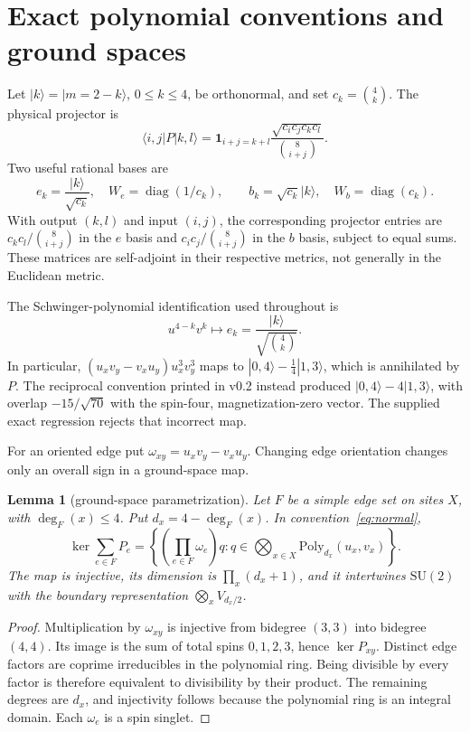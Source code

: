 \documentclass[11pt,a4paper]{article}
\newtheorem{lemma}[theorem]{Lemma}\newtheorem{proposition}[theorem]{Proposition}
\theoremstyle{remark}\newtheorem{remark}[theorem]{Remark}
\begin{document}
\section{Exact polynomial conventions and ground spaces}\label{sec:polynomial}
Let $|k\rangle=|m=2-k\rangle$, $0\le k\le4$, be orthonormal, and set $c_k=\binom4k$. The physical projector is
\begin{equation}\label{eq:P}
 \langle i,j|P|k,l\rangle=
 \mathbf1_{i+j=k+l}\frac{\sqrt{c_ic_jc_kc_l}}{\binom8{i+j}}.
\end{equation}
Two useful rational bases are
\[
 e_k=\frac{|k\rangle}{\sqrt{c_k}},\quad W_e=\operatorname{diag}(1/c_k),
 \qquad b_k=\sqrt{c_k}|k\rangle,\quad W_b=\operatorname{diag}(c_k).
\]
With output $(k,l)$ and input $(i,j)$, the corresponding projector entries are $c_kc_l/\binom8{i+j}$ in the $e$ basis and $c_ic_j/\binom8{i+j}$ in the $b$ basis, subject to equal sums. These matrices are self-adjoint in their respective metrics, not generally in the Euclidean metric.

The Schwinger-polynomial identification used throughout is
\begin{equation}\label{eq:normal}
 u^{4-k}v^k\longmapsto e_k=\frac{|k\rangle}{\sqrt{\binom4k}}.
\end{equation}
In particular, $(u_xv_y-v_xu_y)u_x^3v_y^3$ maps to $|0,4\rangle-\tfrac14|1,3\rangle$, which is annihilated by $P$. The reciprocal convention printed in v0.2 instead produced $|0,4\rangle-4|1,3\rangle$, with overlap $-15/\sqrt{70}$ with the spin-four, magnetization-zero vector. The supplied exact regression rejects that incorrect map.

For an oriented edge put $\omega_{xy}=u_xv_y-v_xu_y$. Changing edge orientation changes only an overall sign in a ground-space map.
\begin{lemma}[ground-space parametrization]\label{lem:vbs}
Let $F$ be a simple edge set on sites $X$, with $\deg_F(x)\le4$. Put $d_x=4-\deg_F(x)$. In convention~\eqref{eq:normal},
\[
 \ker\sum_{e\in F}P_e=
 \left\{\left(\prod_{e\in F}\omega_e\right)q:
 q\in\bigotimes_{x\in X}\mathrm{Poly}_{d_x}(u_x,v_x)\right\}.
\]
The map is injective, its dimension is $\prod_x(d_x+1)$, and it intertwines $\mathrm{SU}(2)$ with the boundary representation $\bigotimes_x V_{d_x/2}$.
\end{lemma}
\begin{proof}
Multiplication by $\omega_{xy}$ is injective from bidegree $(3,3)$ into bidegree $(4,4)$. Its image is the sum of total spins $0,1,2,3$, hence $\ker P_{xy}$. Distinct edge factors are coprime irreducibles in the polynomial ring. Being divisible by every factor is therefore equivalent to divisibility by their product. The remaining degrees are $d_x$, and injectivity follows because the polynomial ring is an integral domain. Each $\omega_e$ is a spin singlet.
\end{proof}
\end{document}
